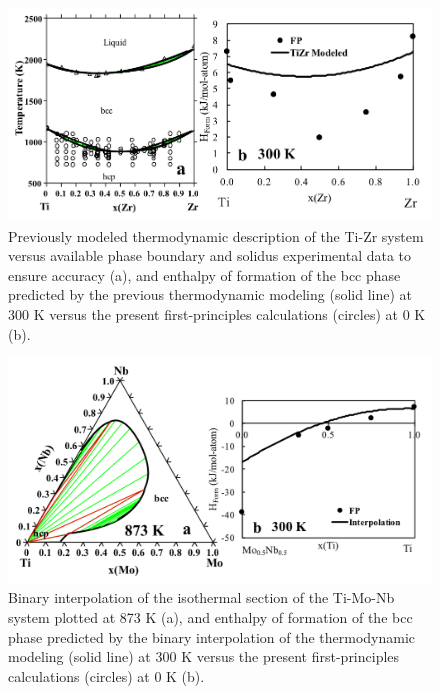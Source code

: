 \newpage
\begin{figure}[H]
	\centering
	\includegraphics[width=\textwidth]{Chapter-3/Figures/TiZr.png}
	\caption{Previously modeled thermodynamic description of the Ti-Zr system versus available phase boundary and solidus experimental data to ensure accuracy \cite{Kumar1994a} (a), and enthalpy of formation of the bcc phase predicted by the previous thermodynamic modeling (solid line) at 300 K versus the present first-principles calculations (circles) at 0 K (b).}
	\label{Ch3-figure:TiZr}
\end{figure}

\newpage
\begin{figure}[H]
	\centering
	\includegraphics[width=\textwidth]{Chapter-3/Figures/TiMoNb.png}
	\caption{Binary interpolation of the isothermal section of the Ti-Mo-Nb system plotted at 873 K (a), and enthalpy of formation of the bcc phase predicted by the binary interpolation of the thermodynamic modeling (solid line) at 300 K versus the present first-principles calculations (circles) at 0 K (b).}
	\label{Ch3-figure:TiMoNb}
\end{figure}

